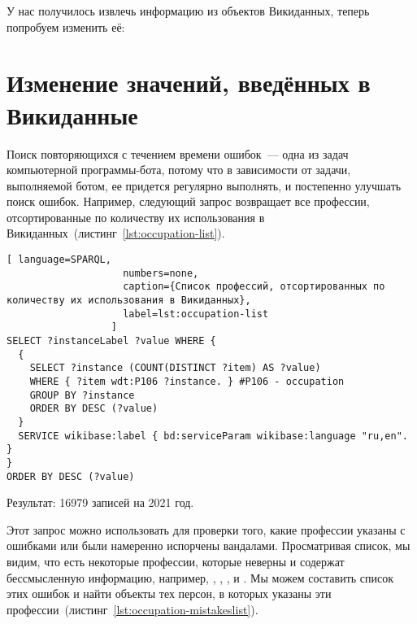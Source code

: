 
У нас получилось извлечь информацию из объектов Викиданных, теперь попробуем изменить её: 

\section{Изменение значений, введённых в Викиданные}
\label{sec:modifying the values entered in Wikidata}

Поиск повторяющихся с течением времени ошибок~--- одна из задач компьютерной программы-бота, потому что в зависимости от задачи, выполняемой ботом, ее придется регулярно выполнять, и постепенно улучшать поиск ошибок. Например, следующий запрос возвращает все профессии, отсортированные по количеству их использования в Викиданных~(листинг~\ref{lst:occupation-list}).

\begin{lstlisting}[ language=SPARQL,
                    numbers=none,
                    caption={Cписок профессий, отсортированных по количеству их использования в Викиданных},
                    label=lst:occupation-list
                  ]
SELECT ?instanceLabel ?value WHERE {
  {
    SELECT ?instance (COUNT(DISTINCT ?item) AS ?value) 
    WHERE { ?item wdt:P106 ?instance. } #P106 - occupation
    GROUP BY ?instance
    ORDER BY DESC (?value)
  }
  SERVICE wikibase:label { bd:serviceParam wikibase:language "ru,en". }
}
ORDER BY DESC (?value)
\end{lstlisting} 

Результат: 16979 записей на 2021 год.

Этот запрос можно использовать для проверки того, какие профессии указаны с ошибками или были намеренно испорчены вандалами. Просматривая список, мы видим, что есть некоторые профессии, которые неверны и содержат бессмысленную информацию, например, , , ,  и . Мы можем составить список этих ошибок и найти объекты тех персон, в которых указаны эти профессии~(листинг~\ref{lst:occupation-mistakeslist}).

